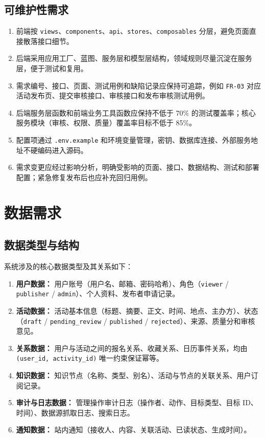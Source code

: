 \documentclass[12pt,a4paper]{ctexart}
\begin{document}
  \subsection{可维护性需求}
  \begin{enumerate}
  \item 前端按 \texttt{views}、\texttt{components}、\texttt{api}、\texttt{stores}、\texttt{composables} 分层，避免页面直接散落接口细节。
  \item 后端采用应用工厂、蓝图、服务层和模型层结构，领域规则尽量沉淀在服务层，便于测试和复用。
  \item 需求编号、接口、页面、测试用例和缺陷记录应保持可追踪，例如 \texttt{FR-03} 对应活动发布页、提交审核接口、审核接口和发布审核测试用例。
  \item 后端服务层函数和前端业务工具函数应保持不低于 70\% 的测试覆盖率；核心服务模块（审核、权限、质量）覆盖率目标不低于 85\%。
  \item 配置项通过 \texttt{.env.example} 和环境变量管理，密钥、数据库连接、外部服务地址不硬编码进入源码。
  \item 需求变更应经过影响分析，明确受影响的页面、接口、数据结构、测试和部署配置；紧急修复发布后也应补充回归用例。
  \end{enumerate}

  \section{数据需求}
  \subsection{数据类型与结构}
  系统涉及的核心数据类型及其关系如下：
  \begin{enumerate}
  \item \textbf{用户数据：} 用户账号（用户名、邮箱、密码哈希）、角色（\texttt{viewer} / \texttt{publisher} / \texttt{admin}）、个人资料、发布者申请记录。
  \item \textbf{活动数据：} 活动基本信息（标题、摘要、正文、时间、地点、主办方）、状态（\texttt{draft} / \texttt{pending\_review} / \texttt{published} / \texttt{rejected}）、来源、质量分和审核意见。
  \item \textbf{关系数据：} 用户与活动之间的报名关系、收藏关系、日历事件关系，均由 \texttt{(user\_id, activity\_id)} 唯一约束保证幂等。
  \item \textbf{知识数据：} 知识节点（名称、类型、别名）、活动与节点的关联关系、用户订阅记录。
  \item \textbf{审计与日志数据：} 管理操作审计日志（操作者、动作、目标类型、目标 ID、时间）、数据源抓取日志、搜索日志。
  \item \textbf{通知数据：} 站内通知（接收人、内容、关联活动、已读状态、生成时间）。
  \end{enumerate}
\end{document}
